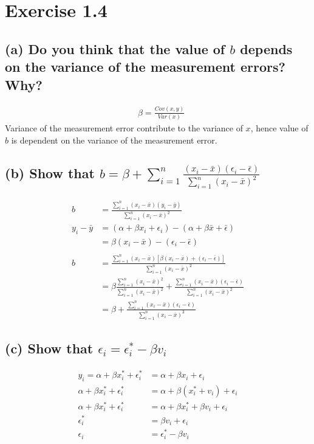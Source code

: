 \documentclass[12pt, a4paper]{article}
\begin{document}
\section*{Exercise 1.4}
\vspace{1em}

\subsection*{(a) Do you think that the value of $b$ depends on the variance of the measurement errors? Why?}
\begin{align*}
    &\beta = \frac{Cov(x, y)}{Var(x)}
\end{align*}
Variance of the measurement error contribute to the variance of $x$, hence value of $b$ is dependent on the variance of the measurement error.
\vspace{1em}


\subsection*{(b) Show that $b = \beta + \sum_{i=1}^n \frac{(x_i - \bar{x})(\epsilon_i - \bar{\epsilon})}{\sum_{i=1}^n(x_i - \bar{x})^2}$}
\begin{align*}
    b&=\frac{\sum_{i=1}^n(x_i-\bar{x})(y_i-\bar{y})}{\sum_{i=1}^n(x_i-\bar{x})^2}\\
    y_i-\bar{y}&= (\alpha + \beta x_i + \epsilon_i) - (\alpha + \beta \bar{x} + \bar{\epsilon})\\
    &=\beta(x_i-\bar{x}) - (\epsilon_i-\bar{\epsilon})\\\\
    b&=\frac{\sum_{i=1}^n(x_i-\bar{x})[\beta (x_i-\bar{x}) +  (\epsilon_i-\bar{\epsilon})]}{\sum_{i=1}^n(x_i-\bar{x})^2}\\
    & = \beta\frac{\sum_{i=1}^n(x_i-\bar{x})^2}{\sum_{i=1}^n(x_i-\bar{x})^2} + \frac{\sum_{i=1}^n(x_i-\bar{x})(\epsilon_i-\bar{\epsilon})}{\sum_{i=1}^n(x_i-\bar{x})^2}\\
    &= \beta + \frac{\sum_{i=1}^n(x_i-\bar{x})(\epsilon_i-\bar{\epsilon})}{\sum_{i=1}^n(x_i-\bar{x})^2}
\end{align*}
\vspace{1em}

\subsection*{(c) Show that $\epsilon_i = \epsilon_i^* - \beta v_i$}
\begin{align*}
    y_i = \alpha + \beta x_i^* + \epsilon_i^* & = \alpha + \beta x_i + \epsilon_i\\
    \alpha + \beta x_i^* + \epsilon_i^* & = \alpha + \beta (x_i^*+v_i) + \epsilon_i\\
    \alpha + \beta x_i^* + \epsilon_i^* & = \alpha + \beta x_i^* + \beta v_i + \epsilon_i\\
    \epsilon_i^* &= \beta v_i + \epsilon_i\\
    \epsilon_i &= \epsilon_i^*-\beta v_i\\
\end{align*}
\vspace{1em}
\end{document}
